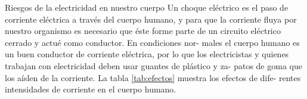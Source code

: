 \begin{sectionbox}{Riesgos de la electricidad en nuestro cuerpo}
Un choque eléctrico es el paso de corriente eléctrica a través del cuerpo humano,
y para que la corriente fluya por nuestro organismo es necesario que éste forme
parte de un circuito eléctrico cerrado y actué como conductor. En condiciones nor-
males el cuerpo humano es un buen conductor de corriente eléctrica, por lo que los
electricistas y quienes trabajan con electricidad deben usar guantes de plástico y za-
patos de goma que los aíslen de la corriente. La tabla \ref{tab:efectos} muestra los efectos de dife-
rentes intensidades de corriente en el cuerpo humano.
\end{sectionbox}
